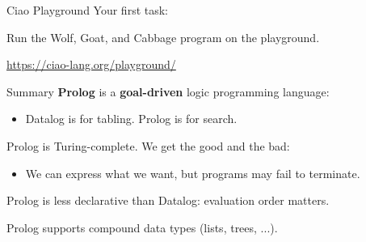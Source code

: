 \begin{frame}{Ciao Playground}
Your first task:

\Large
Run the Wolf, Goat, and Cabbage program on the playground.

\bigskip

\centering
{\Large \url{https://ciao-lang.org/playground/}}
\end{frame}

\begin{frame}{Summary}
\textbf{Prolog} is a \textbf{goal-driven} logic programming language:
%
\begin{itemize}
    \item Datalog is for tabling. Prolog is for search. 
\end{itemize}

\pause 

Prolog is Turing-complete. We get the good and the bad: 
%
\begin{itemize}
    \item We can express what we want, but programs may fail to terminate.
\end{itemize}

\pause 

Prolog is less declarative than Datalog: evaluation order matters.

\pause 

Prolog supports compound data types (lists, trees, ...).
\end{frame}
    
    
\begin{frame}[standout]
\end{frame}


